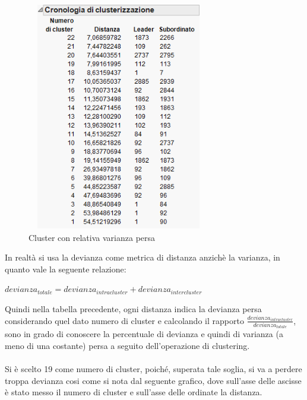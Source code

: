 \begin{figure}[!h]
	\centering
	\includegraphics[width=8cm, height=10cm]{./immagine/cluster.png}
	\caption{Cluster con relativa varianza persa}
	\label{fig:cluster}
\end{figure}

In realtà si usa la devianza come metrica di distanza anzichè la varianza, in quanto vale la seguente relazione:
\begin{center}
	$devianza_{totale}=devianza_{intracluster}+devianza_{intercluster}$
\end{center} 
Quindi nella tabella precedente, ogni distanza indica la devianza persa considerando quel dato numero di cluster e calcolando il rapporto $\frac{devianza_{intracluster}}{devianza_{totale}}$, sono in grado di conoscere la percentuale di devianza e quindi di varianza (a meno di una costante) persa a seguito dell'operazione di clustering.\\\\
Si è scelto 19 come numero di cluster, poiché, superata tale soglia, si va a perdere troppa devianza cosi come si nota dal seguente grafico, dove sull'asse delle ascisse è stato messo il numero di cluster e sull'asse delle ordinate la distanza.\\\\\\\\


